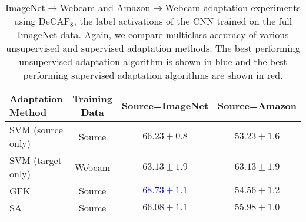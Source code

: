\begin{table*}
\centering
\begin{tabular}{lccc}
\toprule
Adaptation Method & Training Data & Source=ImageNet & Source=Amazon \\
\midrule
SVM (source only) & Source & $66.23 \pm 0.8$ & $53.23 \pm 1.6$ \\
SVM (target only) & Webcam & $63.13 \pm 1.9$ & $63.13 \pm 1.9$ \\
\midrule
GFK \cite{gong-cvpr12} & Source & \textcolor{blue}{$\bm{68.73 \pm 1.1}$} & $54.56 \pm 1.2$ \\
SA \cite{sa} & Source & $66.08 \pm 1.1$ & $55.98 \pm 1.0$ \\
\bottomrule
\end{tabular}
\caption{ImageNet$\rightarrow$Webcam and Amazon$\rightarrow$Webcam adaptation
  experiments using DeCAF$_8$, the label activations of the CNN trained on the
  full ImageNet data. Again, we compare multiclass accuracy of various
  unsupervised and supervised adaptation methods. The best performing
  unsupervised adaptation algorithm is shown in blue and the best performing
  supervised adaptation algorithms are shown in red.}
\label{tab:fc8}
\end{table*}
